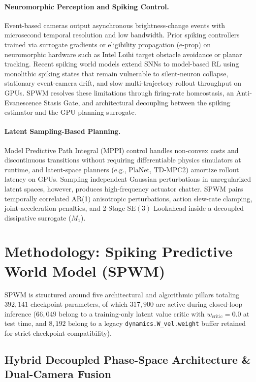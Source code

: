 \documentclass[11pt]{article}
\begin{document}
\paragraph{Neuromorphic Perception and Spiking Control.} Event-based cameras output asynchronous brightness-change events with microsecond temporal resolution and low bandwidth. Prior spiking controllers trained via surrogate gradients or eligibility propagation (e-prop) on neuromorphic hardware such as Intel Loihi target obstacle avoidance or planar tracking. Recent spiking world models extend SNNs to model-based RL using monolithic spiking states that remain vulnerable to silent-neuron collapse, stationary event-camera drift, and slow multi-trajectory rollout throughput on GPUs. SPWM resolves these limitations through firing-rate homeostasis, an Anti-Evanescence Stasis Gate, and architectural decoupling between the spiking estimator and the GPU planning surrogate.

\paragraph{Latent Sampling-Based Planning.} Model Predictive Path Integral (MPPI) control handles non-convex costs and discontinuous transitions without requiring differentiable physics simulators at runtime, and latent-space planners (e.g., PlaNet, TD-MPC2) amortize rollout latency on GPUs. Sampling independent Gaussian perturbations in unregularized latent spaces, however, produces high-frequency actuator chatter. SPWM pairs temporally correlated AR(1) anisotropic perturbations, action slew-rate clamping, joint-acceleration penalties, and 2-Stage $\text{SE}(3)$ Lookahead inside a decoupled dissipative surrogate ($M_1$).

\section{Methodology: Spiking Predictive World Model (SPWM)}

SPWM is structured around five architectural and algorithmic pillars totaling $392{,}141$ checkpoint parameters, of which $317{,}900$ are active during closed-loop inference ($66{,}049$ belong to a training-only latent value critic with $w_{\text{critic}} = 0.0$ at test time, and $8{,}192$ belong to a legacy \texttt{dynamics.W\_vel.weight} buffer retained for strict checkpoint compatibility).

\subsection{Hybrid Decoupled Phase-Space Architecture \& Dual-Camera Fusion}
\end{document}

